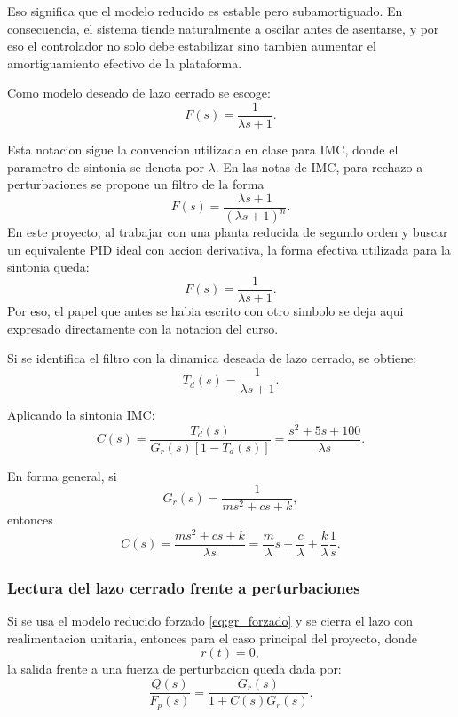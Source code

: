 \documentclass[11pt]{article}
\begin{document}
Eso significa que el modelo reducido es estable pero subamortiguado. En consecuencia, el sistema tiende naturalmente a oscilar antes de asentarse, y por eso el controlador no solo debe estabilizar sino tambien aumentar el amortiguamiento efectivo de la plataforma.

Como modelo deseado de lazo cerrado se escoge:
\begin{equation}
F(s)=\frac{1}{\lambda s+1}.
\end{equation}

Esta notacion sigue la convencion utilizada en clase para IMC, donde el parametro de sintonia se denota por $\lambda$. En las notas de IMC, para rechazo a perturbaciones se propone un filtro de la forma
\[
F(s)=\frac{\lambda s+1}{(\lambda s+1)^n}.
\]
En este proyecto, al trabajar con una planta reducida de segundo orden y buscar un equivalente PID ideal con accion derivativa, la forma efectiva utilizada para la sintonia queda:
\[
F(s)=\frac{1}{\lambda s+1}.
\]
Por eso, el papel que antes se habia escrito con otro simbolo se deja aqui expresado directamente con la notacion del curso.

Si se identifica el filtro con la dinamica deseada de lazo cerrado, se obtiene:
\begin{equation}
T_d(s)=\frac{1}{\lambda s+1}.
\end{equation}

Aplicando la sintonia IMC:
\begin{equation}
C(s)=\frac{T_d(s)}{G_r(s)\left[1-T_d(s)\right]}
=
\frac{s^2+5s+100}{\lambda s}.
\label{eq:control_imc}
\end{equation}

En forma general, si
\[
G_r(s)=\frac{1}{ms^2+cs+k},
\]
entonces
\begin{equation}
C(s)=\frac{ms^2+cs+k}{\lambda s}
=
\frac{m}{\lambda}s+\frac{c}{\lambda}+\frac{k}{\lambda}\frac{1}{s}.
\label{eq:control_imc_general}
\end{equation}

\subsubsection{Lectura del lazo cerrado frente a perturbaciones}

Si se usa el modelo reducido forzado \eqref{eq:gr_forzado} y se cierra el lazo con realimentacion unitaria, entonces para el caso principal del proyecto, donde
\[
r(t)=0,
\]
la salida frente a una fuerza de perturbacion queda dada por:
\begin{equation}
\frac{Q(s)}{F_p(s)}=\frac{G_r(s)}{1+C(s)G_r(s)}.
\label{eq:disturbance_cl}
\end{equation}
\end{document}

